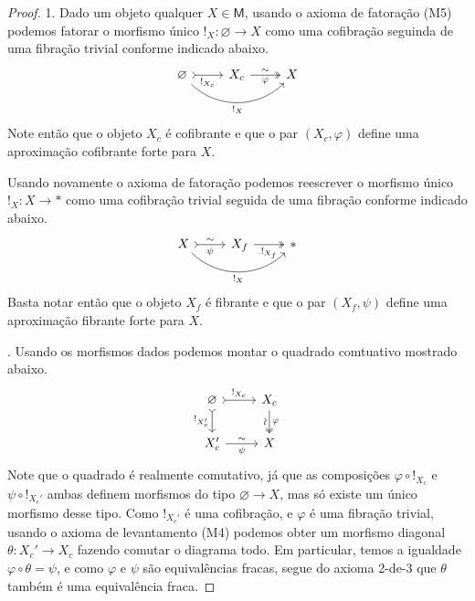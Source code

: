 \begin{proof}
  1. Dado um objeto qualquer $X \in \mathsf{M}$, usando o axioma de fatoração (M5) podemos fatorar o morfismo único $!_{X}: \varnothing \to X$ como uma cofibração seguinda de uma fibração trivial conforme indicado abaixo.
  \begin{displaymath}
    \begin{tikzcd}
      \varnothing
      \arrow[r, tail, "!_{X_{c}}" swap]
      \arrow[rr, bend right=45, "!_{X}" swap]
      & X_{c}
      \arrow[r, two heads, "\varphi" {swap}, "\sim"]
      & X
    \end{tikzcd}
  \end{displaymath}
  Note então que o objeto $X_{c}$ é cofibrante e que o par $(X_{c},\varphi)$ define uma aproximação cofibrante forte para $X$.

  Usando novamente o axioma de fatoração podemos reescrever o morfismo único $!_{X}: X \to *$ como uma cofibração trivial seguida de uma fibração conforme indicado abaixo.
  \begin{displaymath}
    \begin{tikzcd}
      X
      \arrow[r, tail, "\sim", "\psi" {swap}]
      \arrow[rr, bend right=45, "!_{X}" swap]
      & X_{f}
      \arrow[r, two heads, "!_{X_{f}}" swap]
      & *
    \end{tikzcd}
  \end{displaymath}
  Basta notar então que o objeto $X_{f}$ é fibrante e que o par $(X_{f},\psi)$ define uma aproximação fibrante forte para $X$.

  . Usando os morfismos dados podemos montar o quadrado comtuativo mostrado abaixo.
  \begin{displaymath}
    \begin{tikzcd}
      \varnothing
      \arrow[r, tail, "!_{X_{c}}"]
      \arrow[d, tail, "!_{X_{c}'}" swap]
      & X_{c}
      \arrow[d, two heads, "\sim" {swap, sloped}, "\varphi"]
      \\ X_{c}'
      \arrow[r, "\sim", "\psi" {swap}]
      & X
    \end{tikzcd}
  \end{displaymath}
  Note que o quadrado é realmente comutativo, já que as composições $\varphi \circ !_{X_{c}}$ e $\psi \circ !_{X_{c}'}$ ambas definem morfismos do tipo $\varnothing \to X$, mas só existe um único morfismo desse tipo.
  Como $!_{X_{c}'}$ é uma cofibração, e $\varphi$ é uma fibração trivial, usando o axioma de levantamento (M4) podemos obter um morfismo diagonal $\theta: X_{c}' \to X_{c}$ fazendo comutar o diagrama todo.
  Em particular, temos a igualdade $\varphi \circ \theta = \psi$, e como $\varphi$ e $\psi$ são equivalências fracas, segue do axioma 2-de-3 que $\theta$ também é uma equivalência fraca.


\end{proof}
